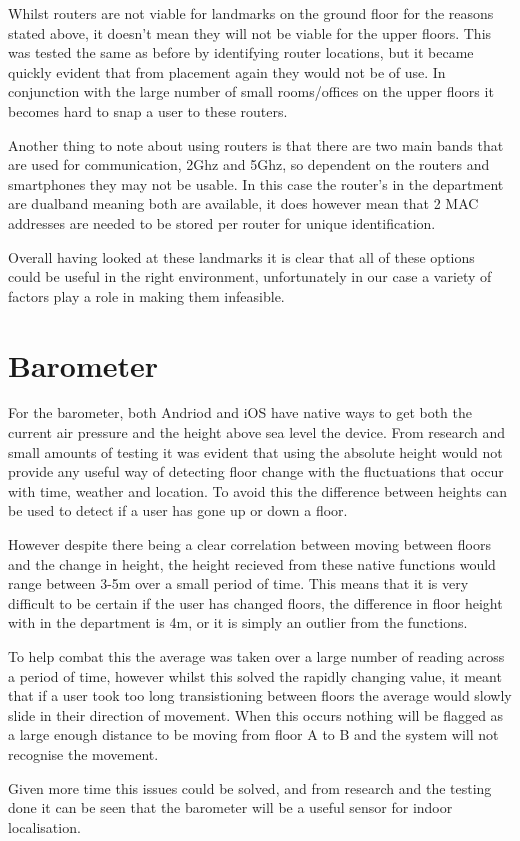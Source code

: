 \documentclass[main.tex]{subfiles}
\begin{document}
Whilst routers are not viable for landmarks on the ground floor for the reasons stated above, it doesn't mean they will not be viable for the upper floors. This was tested the same as before by identifying router locations, but it became quickly evident that from placement again they would not be of use. In conjunction with the large number of small rooms/offices on the upper floors it becomes hard to snap a user to these routers.

Another thing to note about using routers is that there are two main bands that are used for communication, 2Ghz and 5Ghz, so dependent on the routers and smartphones they may not be usable. In this case the router's in the department are dualband meaning both are available, it does however mean that 2 MAC addresses are needed to be stored per router for unique identification.

Overall having looked at these landmarks it is clear that all of these options could be useful in the right environment, unfortunately in our case a variety of factors play a role in making them infeasible.

\section{Barometer}

For the barometer, both Andriod and iOS have native ways to get both the current air pressure and the height above sea level the device. From research and small amounts of testing it was evident that using the absolute height would not provide any useful way of detecting floor change with the fluctuations that occur with time, weather and location. To avoid this the difference between heights can be used to detect if a user has gone up or down a floor. 

However despite there being a clear correlation between moving between floors and the change in height, the height recieved from these native functions would range between 3-5m over a small period of time. This means that it is very difficult to be certain if the user has changed floors, the difference in floor height with in the department is 4m, or it is simply an outlier from the functions. 

To help combat this the average was taken over a large number of reading across a period of time, however whilst this solved the rapidly changing value, it meant that if a user took too long transistioning between floors the average would slowly slide in their direction of movement. When this occurs nothing will be flagged as a large enough distance to be moving from floor A to B and the system will not recognise the movement. 

Given more time this issues could be solved, and from research and the testing done it can be seen that the barometer will be a useful sensor for indoor localisation.
\end{document}
